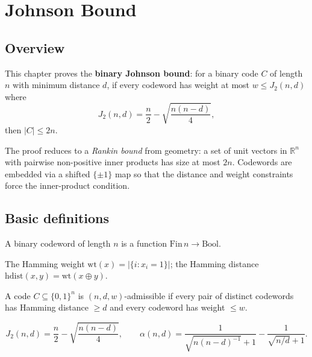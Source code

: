 \chapter{Johnson Bound}
\section{Overview}

This chapter proves the \textbf{binary Johnson bound}: for a binary code $C$
of length $n$ with minimum distance $d$, if every codeword has weight at most
$w \le J_2(n,d)$ where
\[
J_2(n,d) = \frac{n}{2} - \sqrt{\frac{n(n-d)}{4}},
\]
then $|C| \le 2n$.

The proof reduces to a \emph{Rankin bound} from geometry: a set of unit
vectors in $\mathbb{R}^n$ with pairwise non-positive inner products has
size at most $2n$.  Codewords are embedded via a shifted $\{\pm1\}$ map so
that the distance and weight constraints force the inner-product condition.

\section{Basic definitions}

\begin{definition}
\leanok
A binary codeword of length $n$ is a function $\mathrm{Fin}\,n \to \mathrm{Bool}$.
\end{definition}

\begin{definition}
\leanok
The Hamming weight $\mathrm{wt}(x) = |\{i : x_i = 1\}|$; the Hamming distance
$\mathrm{hdist}(x,y) = \mathrm{wt}(x \oplus y)$.
\end{definition}

\begin{definition}
\leanok
{}
A code $C \subseteq \{0,1\}^n$ is $(n,d,w)$-admissible if every pair of distinct
codewords has Hamming distance $\ge d$ and every codeword has weight $\le w$.
\end{definition}

\begin{definition}
\leanok
\[
J_2(n,d) = \frac{n}{2} - \sqrt{\frac{n(n-d)}{4}}, \qquad
\alpha(n,d) = \frac{1}{\sqrt{n(n-d)^{-1}} + 1} - \frac{1}{\sqrt{n/d}+1}.
\]
\end{definition}

